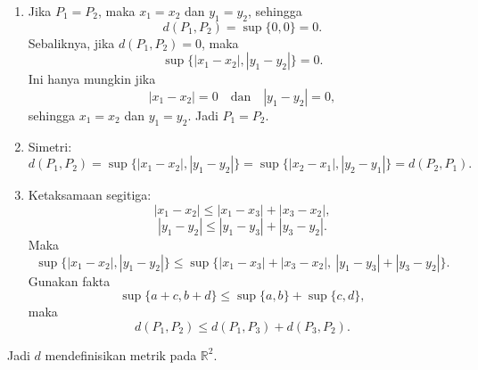 \documentclass[11pt,letterpaper]{article}
\newcommand{\R}{\mathbb{R}}
\begin{document}
\begin{enumerate}
\begin{enumerate}[label=\arabic*.]
          \item Jika $P_1=P_2$, maka $x_1=x_2$ dan $y_1=y_2$, sehingga
                \[
                  d(P_1,P_2)=\sup\{0,0\}=0.
                \]
                Sebaliknya, jika $d(P_1,P_2)=0$, maka
                \[
                  \sup\{|x_1-x_2|,|y_1-y_2|\}=0.
                \]
                Ini hanya mungkin jika
                \[
                  |x_1-x_2|=0 \quad \text{dan} \quad |y_1-y_2|=0,
                \]
                sehingga $x_1=x_2$ dan $y_1=y_2$. Jadi $P_1=P_2$.

          \item Simetri:
                \[
                  d(P_1,P_2)
                  =
                  \sup\{|x_1-x_2|,|y_1-y_2|\}
                  =
                  \sup\{|x_2-x_1|,|y_2-y_1|\}
                  =
                  d(P_2,P_1).
                \]

          \item Ketaksamaan segitiga:
                \[
                  |x_1-x_2|
                  \le
                  |x_1-x_3|+|x_3-x_2|,
                \]
                \[
                  |y_1-y_2|
                  \le
                  |y_1-y_3|+|y_3-y_2|.
                \]
                Maka
                \[
                  \sup\{|x_1-x_2|,|y_1-y_2|\}
                  \le
                  \sup\{|x_1-x_3|+|x_3-x_2|,\ |y_1-y_3|+|y_3-y_2|\}.
                \]
                Gunakan fakta
                \[
                  \sup\{a+c,b+d\}\le \sup\{a,b\}+\sup\{c,d\},
                \]
                maka
                \[
                  d(P_1,P_2)\le d(P_1,P_3)+d(P_3,P_2).
                \]
        \end{enumerate}

        Jadi $d$ mendefinisikan metrik pada $\R^2$.
\end{enumerate}
\end{document}
